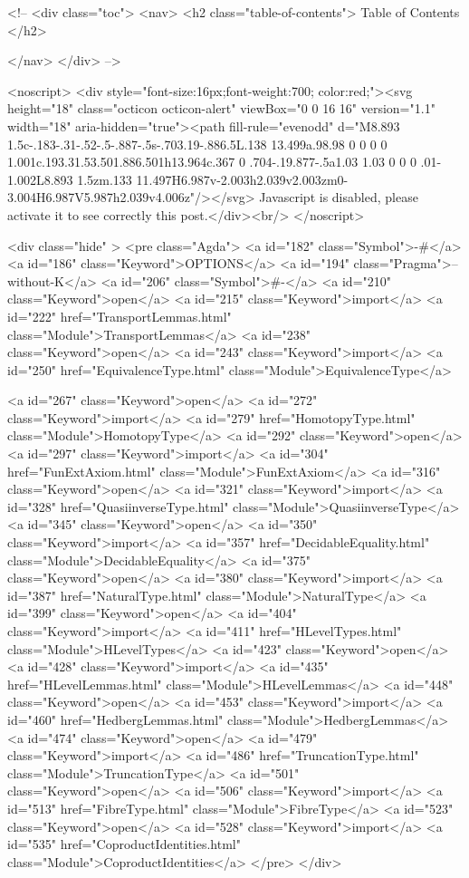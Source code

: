   <!-- 
  <div class="toc">
    <nav>
    <h2 class="table-of-contents"> Table of Contents </h2>
      

    </nav>
  </div>
   -->

  <noscript>
  <div style="font-size:16px;font-weight:700; color:red;"><svg height="18" class="octicon octicon-alert" viewBox="0 0 16 16" version="1.1" width="18" aria-hidden="true"><path fill-rule="evenodd" d="M8.893 1.5c-.183-.31-.52-.5-.887-.5s-.703.19-.886.5L.138 13.499a.98.98 0 0 0 0 1.001c.193.31.53.501.886.501h13.964c.367 0 .704-.19.877-.5a1.03 1.03 0 0 0 .01-1.002L8.893 1.5zm.133 11.497H6.987v-2.003h2.039v2.003zm0-3.004H6.987V5.987h2.039v4.006z"/></svg> Javascript is disabled, please activate it to see correctly this post.</div><br/>
  </noscript>

  <div class="hide" >
<pre class="Agda">
<a id="182" class="Symbol">{-#</a> <a id="186" class="Keyword">OPTIONS</a> <a id="194" class="Pragma">--without-K</a> <a id="206" class="Symbol">#-}</a>
<a id="210" class="Keyword">open</a> <a id="215" class="Keyword">import</a> <a id="222" href="TransportLemmas.html" class="Module">TransportLemmas</a>
<a id="238" class="Keyword">open</a> <a id="243" class="Keyword">import</a> <a id="250" href="EquivalenceType.html" class="Module">EquivalenceType</a>

<a id="267" class="Keyword">open</a> <a id="272" class="Keyword">import</a> <a id="279" href="HomotopyType.html" class="Module">HomotopyType</a>
<a id="292" class="Keyword">open</a> <a id="297" class="Keyword">import</a> <a id="304" href="FunExtAxiom.html" class="Module">FunExtAxiom</a>
<a id="316" class="Keyword">open</a> <a id="321" class="Keyword">import</a> <a id="328" href="QuasiinverseType.html" class="Module">QuasiinverseType</a>
<a id="345" class="Keyword">open</a> <a id="350" class="Keyword">import</a> <a id="357" href="DecidableEquality.html" class="Module">DecidableEquality</a>
<a id="375" class="Keyword">open</a> <a id="380" class="Keyword">import</a> <a id="387" href="NaturalType.html" class="Module">NaturalType</a>
<a id="399" class="Keyword">open</a> <a id="404" class="Keyword">import</a> <a id="411" href="HLevelTypes.html" class="Module">HLevelTypes</a>
<a id="423" class="Keyword">open</a> <a id="428" class="Keyword">import</a> <a id="435" href="HLevelLemmas.html" class="Module">HLevelLemmas</a>
<a id="448" class="Keyword">open</a> <a id="453" class="Keyword">import</a> <a id="460" href="HedbergLemmas.html" class="Module">HedbergLemmas</a>
<a id="474" class="Keyword">open</a> <a id="479" class="Keyword">import</a> <a id="486" href="TruncationType.html" class="Module">TruncationType</a>
<a id="501" class="Keyword">open</a> <a id="506" class="Keyword">import</a> <a id="513" href="FibreType.html" class="Module">FibreType</a>
<a id="523" class="Keyword">open</a> <a id="528" class="Keyword">import</a> <a id="535" href="CoproductIdentities.html" class="Module">CoproductIdentities</a>
</pre>
</div>

